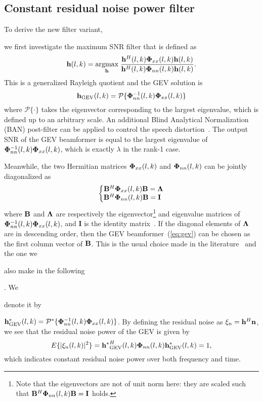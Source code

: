 \documentclass[review]{elsarticle}
\newif\ifproofread
\newcommand{\pfmarker}[1]{%
\ifproofread
\textcolor{red}{#1}%
\else
#1%
\fi
}
\begin{document}
\pfmarker{\subsection{Constant residual noise power filter}}

\pfmarker{To derive the new filter variant,} we first investigate the maximum SNR filter that is defined as
\begin{equation}\label{eq:gev-def}
{\bf h}\pfmarker{(l,k)}=\underset{\bf h}{\text{argmax}} \; \frac{{\bf h}^H\pfmarker{(l,k)}{\bf \Phi}_{xx}\pfmarker{(l,k)}{\bf h}\pfmarker{(l,k)}}{{\bf h}^H\pfmarker{(l,k)}{\bf \Phi}_{nn}\pfmarker{(l,k)}{\bf h}\pfmarker{(l,k)}}.
\end{equation}
This is a generalized Rayleigh quotient and the GEV solution is
\begin{equation}\label{eq:gev}
{\bf h}_{\text{GEV}}\pfmarker{(l,k)}= \mathcal{P} \{ {\bf \Phi}_{nn}^{-1}\pfmarker{(l,k)}{\bf \Phi}_{xx}\pfmarker{(l,k)} \}
\end{equation}
where $\mathcal{P}\{ \cdot \}$ takes the eigenvector corresponding to the largest eigenvalue, which is defined up to an arbitrary scale. An additional Blind Analytical Normalization (BAN) post-filter can be applied to control the speech distortion~\cite{2007GEV}. The output SNR of the GEV beamformer is equal to the largest eigenvalue of ${\bf \Phi}_{nn}^{-1}(l,k){\bf \Phi}_{xx}(l,k)$, which is exactly $\lambda$ in the rank-1 case.

Meanwhile, the two Hermitian matrices ${\bf \Phi}_{xx}(l,k)$ and ${\bf \Phi}_{nn}(l,k)$ can be jointly diagonalized as
\begin{equation}\label{eq:jointdiag}
\left \{ \begin{matrix}
{\bf B}^H{\bf \Phi}_{xx}\pfmarker{(l,k)}{\bf B}={\bf \Lambda}  \\
{\bf B}^H{\bf \Phi}_{nn}\pfmarker{(l,k)}{\bf B}={\bf I} ~
\end{matrix}\right.
\end{equation}
where ${\bf B}$ and ${\bf \Lambda}$ are respectively the eigenvector\footnote{Note that the eigenvectors are not of unit norm here: they are scaled such that ${\bf B}^H{\bf \Phi}_{nn}(l,k){\bf B}={\bf I}$ holds.} and eigenvalue matrices of ${\bf \Phi}_{nn}^{-1}(l,k){\bf \Phi}_{xx}(l,k)$, and {\bf I} is the identity matrix~\cite{2016vsfilter}. If the diagonal elements of ${\bf \Lambda}$ are in descending order, then the GEV beamformer~(\ref{eq:gev}) can be chosen as the first column vector of ${\bf B}$. This is the usual choice made in the literature~\cite{2007GEV} and the one we \pfmarker{also make in the following}. We \pfmarker{denote it by} ${\bf h}^{*}_{\text{GEV}}(l,k)= \mathcal{P}^{*} \{ {\bf \Phi}_{nn}^{-1}(l,k){\bf \Phi}_{xx}(l,k) \}$. By defining the residual noise as $\xi_n={\bf h}^H{\bf n}$, we see that the residual noise power of the GEV is given by
\begin{equation}\label{eq:rnp1}
  E\{|\xi_n\pfmarker{(l,k)}|^2\}={{\bf h}^{*}}^H_{\text{GEV}}\pfmarker{(l,k)}{\bf \Phi}_{nn}\pfmarker{(l,k)}{\bf h}^{*}_{\text{GEV}}\pfmarker{(l,k)}=1,
\end{equation}
which indicates constant residual noise power over both frequency and time.
\end{document}
